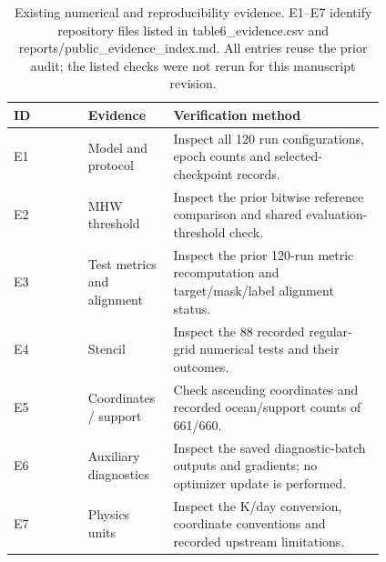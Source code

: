 \begin{table}
\caption{Existing numerical and reproducibility evidence. E1–E7 identify repository files listed in table6\_evidence.csv and reports/public\_evidence\_index.md. All entries reuse the prior audit; the listed checks were not rerun for this manuscript revision.}
\label{tab:table6_evidence}
\begin{tabular}{lp{0.23\linewidth}p{0.58\linewidth}}
\toprule
ID & Evidence & Verification method \\
\midrule
E1 & Model and protocol & Inspect all 120 run configurations, epoch counts and selected-checkpoint records. \\
E2 & MHW threshold & Inspect the prior bitwise reference comparison and shared evaluation-threshold check. \\
E3 & Test metrics and alignment & Inspect the prior 120-run metric recomputation and target/mask/label alignment status. \\
E4 & Stencil & Inspect the 88 recorded regular-grid numerical tests and their outcomes. \\
E5 & Coordinates / support & Check ascending coordinates and recorded ocean/support counts of 661/660. \\
E6 & Auxiliary diagnostics & Inspect the saved diagnostic-batch outputs and gradients; no optimizer update is performed. \\
E7 & Physics units & Inspect the K/day conversion, coordinate conventions and recorded upstream limitations. \\
\bottomrule
\end{tabular}
\end{table}

